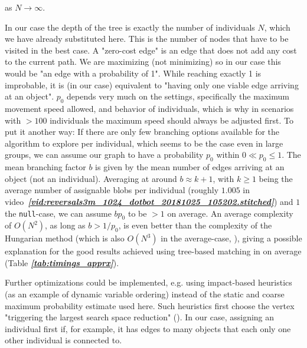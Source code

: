 \documentclass[9pt,lineno]{elife}
\newcommand{\tableref}[1]{\textit{\textbf{\ref{tab:#1}}}\xspace}
\newcommand{\videoref}[1]{video~\textit{\textbf{\ref{#1}}}}
\newcommand{\TRex}{\protect\path{TRex}}
\begin{document}
\begin{appendixbox}
as $N\rightarrow\infty$.

In our case the depth of the tree is exactly the number of individuals $N$, which we have already substituted here. This is the number of nodes that have to be visited in the best case. A "zero-cost edge" is an edge that does not add any cost to the current path. We are maximizing (not minimizing) so in our case this would be "an edge with a probability of 1". While reaching exactly 1 is improbable, it is (in our case) equivalent to "having only one viable edge arriving at an object". $p_0$ depends very much on the settings, specifically the maximum movement speed allowed, and behavior of individuals, which is why in scenarios with $>100$ individuals the maximum speed should always be adjusted first. To put it another way: If there are only few branching options available for the algorithm to explore per individual, which seems to be the case even in large groups, we can assume our graph to have a probability $p_0$ within $0 \ll p_0 \leq 1$. The mean branching factor $b$ is given by the mean number of edges arriving at an object (not an individual). Averaging at around $b \approx k + 1$, with $k \geq 1$ being the average number of assignable blobs per individual (roughly $1.005$ in \videoref{vid:reversals3m_1024_dotbot_20181025_105202.stitched}) and $1$ the \texttt{null}-case, we can assume $bp_0$ to be $>1$ on average. An average complexity of $O(N^2)$, as long as $b > 1 / p_0$, is even better than the complexity of the Hungarian method (which is also $O(N^3)$ in the average-case, \cite{bertsekas1981new}), giving a possible explanation for the good results achieved using tree-based matching in \TRex{} on average (Table \tableref{timings_apprx}).





Further optimizations could be implemented, e.g. using impact-based heuristics (as an example of dynamic variable ordering) instead of the static and coarse maximum probability estimate used here. Such heuristics first choose the vertex "triggering the largest search space reduction" (\cite{pesant2012counting}). In our case, assigning an individual first if, for example, it has edges to many objects that each only one other individual is connected to.

\end{appendixbox}
\end{document}
